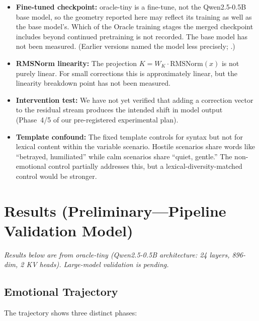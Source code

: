 \documentclass[11pt,a4paper]{article}
\begin{document}
\begin{itemize}[nosep]
    \item \textbf{Fine-tuned checkpoint:} oracle-tiny is a fine-tune, not
          the Qwen2.5-0.5B base model, so the geometry reported here may
          reflect its training as well as the base model's. Which of the
          Oracle training stages the merged checkpoint includes beyond
          continued pretraining is not recorded. The base model has not
          been measured. (Earlier versions named the model less
          precisely; .)
    \item \textbf{RMSNorm linearity:} The projection
          $K = W_K \cdot \text{RMSNorm}(x)$ is not purely linear. For
          small corrections this is approximately linear, but the
          linearity breakdown point has not been measured.
    \item \textbf{Intervention test:} We have not yet verified that
          adding a correction vector to the residual stream produces the
          intended shift in model output (Phase~4/5 of our pre-registered
          experimental plan).
    \item \textbf{Template confound:} The fixed template controls for
          syntax but not for lexical content within the variable scenario.
          Hostile scenarios share words like ``betrayed, humiliated''
          while calm scenarios share ``quiet, gentle.'' The non-emotional
          control partially addresses this, but a
          lexical-diversity-matched control would be stronger.
\end{itemize}

\section{Results (Preliminary---Pipeline Validation Model)}
\label{sec:results}

\emph{Results below are from oracle-tiny (Qwen2.5-0.5B architecture: 24 layers, 896-dim, 2 KV heads).
Large-model validation is pending.}

\subsection{Emotional Trajectory}

The trajectory shows three distinct phases:
\end{document}
